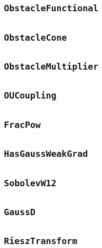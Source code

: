 \documentclass[11pt]{amsart}
\theoremstyle{definition}
\begin{document}
\subsection{\texorpdfstring{\texttt{ObstacleFunctional}}{ObstacleFunctional}}\label{node:ObstacleFunctional}


\subsection{\texorpdfstring{\texttt{ObstacleCone}}{ObstacleCone}}\label{node:ObstacleCone}


\subsection{\texorpdfstring{\texttt{ObstacleMultiplier}}{ObstacleMultiplier}}\label{node:ObstacleMultiplier}


\subsection{\texorpdfstring{\texttt{OUCoupling}}{OUCoupling}}\label{node:OUCoupling}


\subsection{\texorpdfstring{\texttt{FracPow}}{FracPow}}\label{node:FracPow}


\subsection{\texorpdfstring{\texttt{HasGaussWeakGrad}}{HasGaussWeakGrad}}\label{node:HasGaussWeakGrad}


\subsection{\texorpdfstring{\texttt{SobolevW12}}{SobolevW12}}\label{node:SobolevW12}


\subsection{\texorpdfstring{\texttt{GaussD}}{GaussD}}\label{node:GaussD}


\subsection{\texorpdfstring{\texttt{RieszTransform}}{RieszTransform}}\label{node:RieszTransform}

\end{document}
